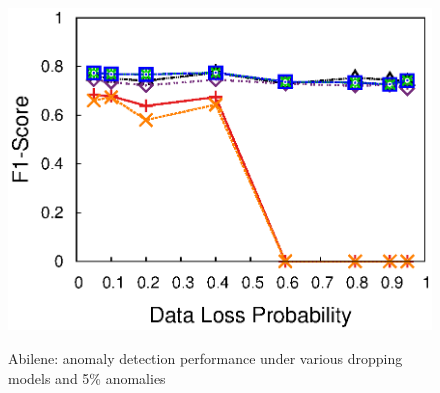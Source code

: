 {\begin{figure}[h!]
{    \includegraphics[width=\figurewidthQ]{fig/dect.ColRandLoss.srmf_based_pred.tm_abilene.od..1008.11.11.1008.r8.period1.org.2d.col.ind.loss0.5.burst1.na0.05.anom0.4.noise0.thresh0.eps}
  }
  \vspace{-0.15in}
  \caption{Abilene: anomaly detection performance under various
    dropping models and 5\% anomalies}
  \vspace{-0.15in}
  \label{fig:abilene-drop-mode-detection}
\end{figure}

}
